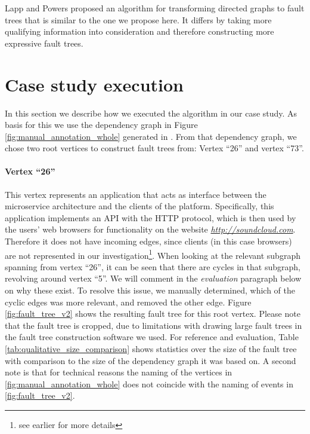 Lapp and Powers \cite{LAP77} proposed an algorithm for transforming directed graphs to fault trees that is similar to the one we propose here. It differs by taking more qualifying information into consideration and therefore constructing more expressive fault trees.

\section{Case study execution}
\label{sec:case_study_execution}

In this section we describe how we executed the algorithm in our case study. As basis for this we use the dependency graph in Figure \ref{fig:manual_annotation_whole} generated in . From that dependency graph, we chose two
root vertices to construct fault trees from: Vertex ``26'' and vertex ``73''.


\paragraph{Vertex ``26''} This vertex represents an application that acts as interface between the microservice architecture and the clients of the platform. Specifically, this application implements an API with the HTTP protocol, which is then used by the users' web browsers for functionality on the website \emph{\url{http://soundcloud.com}}. Therefore it does not have incoming edges, since clients (in this case browsers) are not represented in our investigation\footnote{see earlier  for more details}. When looking at the relevant subgraph spanning from vertex ``26'', it can be seen that there are cycles in that subgraph, revolving around vertex ``5''. We will comment in the \emph{evaluation} paragraph below on why these exist. To resolve this issue, we manually determined, which of the cyclic edges was more relevant, and removed the other edge. Figure \ref{fig:fault_tree_v2} shows the resulting fault tree for this root vertex. Please note that the fault tree is cropped, due to limitations with drawing large fault trees in the fault tree construction software we used. For reference and evaluation, Table \ref{tab:qualitative_size_comparison} shows statistics over the size of the fault tree with comparison to the size of the dependency graph it was based on. A second note is that for technical reasons the naming of the vertices in \autoref{fig:manual_annotation_whole} does not coincide with the naming of events in \autoref{fig:fault_tree_v2}.


